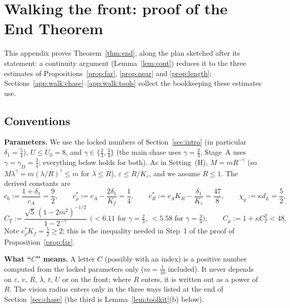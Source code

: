 \providecommand{\eps}{\varepsilon}
\providecommand{\Fam}{\mathcal{F}}
\providecommand{\FamS}{\mathcal{F}_*}
\providecommand{\rhoarc}{\underline{\rho}}
\providecommand{\Tdef}{T_{\mathrm{def}}}

\section{Walking the front: proof of the End Theorem}\label{app:walk}

This appendix proves Theorem~\ref{thm:end}, along the plan sketched after its statement: a continuity argument
(Lemma~\ref{lem:cont}) reduces it to the three estimates of Propositions~\ref{prop:far}, \ref{prop:near} and
\ref{prop:length}; Sections~\ref{app:walk:chase}--\ref{app:walk:tools} collect the bookkeeping these estimates use.

\subsection{Conventions}\label{app:walk:conv}

\textbf{Parameters.} We use the locked numbers of Section~\ref{sec:intro} (in particular $\delta_1=\frac54$),
$U\le U_0=8$, and $\gamma\in\{\frac23,\frac34\}$ (the main
chase uses $\gamma=\frac23$, Stage~A uses $\gamma=\gamma_D=\frac34$; everything below holds for both). As in
Setting~(H), $M=mR^{-\gamma}$ (so $M\lambda^\gamma=m(\lambda/R)^\gamma\le m$ for $\lambda\le R$),
$\eps\le R/K_\eps$, and we assume $R\le1$. The derived constants are
\[
c_6:=\frac{1+\delta_1}{c_A}=\frac92,\qquad
c_\rho^*:=c_A-\frac{2\delta_1}{K_f}=\frac14,\qquad
c_R^*:=c_AK_R-\frac{\delta_1}{K_\eps}=\frac{47}8,\qquad
\chi_g:=\kappa d_L=\frac52,
\]
\[
C_T:=\frac{\sqrt5\,(1-2m^2)^{-1/2}}{1-2^{-\gamma}}\ \ \bigl(<6.11\text{ for }\gamma=\tfrac23,\ <5.58\text{ for }\gamma=\tfrac34\bigr),
\qquad C_\mu:=1+\kappa C_T^2<48 .
\]
Note $c_\rho^*K_f=\frac52\ge2$; this is the inequality needed in Step~1 of the proof of Proposition~\ref{prop:far}.

\textbf{What ``$C$'' means.} A letter $C$ (possibly with an index) is a positive number computed from the locked
parameters only ($m=\frac1{10}$ included). It never depends on $\eps$, $v$, $R$, $\lambda$, $t$, $U$ or on the front;
where $R$ enters, it is written out as a power of $R$. The vision radius enters only in the three ways listed at the
end of Section~\ref{sec:chase} (the third is Lemma~\ref{lem:toolkit}(b) below).

